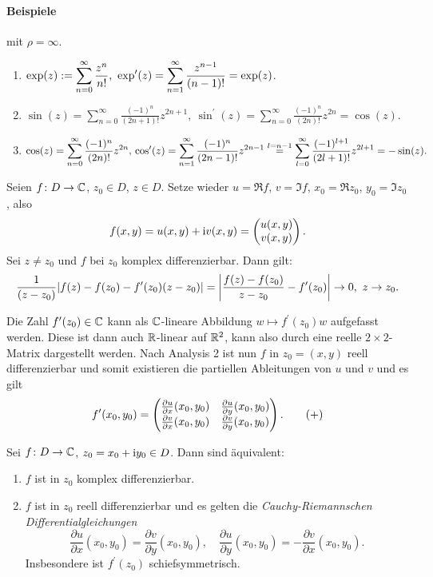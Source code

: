 \documentclass[a4paper,twoside,DIV15,BCOR12mm]{scrbook}
\begin{document}
\paragraph{Beispiele} mit $\rho = \infty$.\begin{enumerate}
\item $\displaystyle \exp(z) := \sum_{n=0}^\infty \frac{z^n}{n!},\ \exp^\prime(z) = \sum_{n=1}^\infty \frac{z^{n-1}}{(n-1)!} = \exp(z)$.
\item $\displaystyle \sin(z) = \sum_{n=0}^\infty \frac{(-1)^n}{(2n+1)!}z^{2n+1},\ \sin^\prime(z) = \sum_{n=0}^\infty \frac{(-1)^n}{(2n)!}z^{2n} = \cos(z).$
\item $\displaystyle \cos(z) = \sum_{n=0}^\infty \frac{(-1)^n}{(2n)!}z^{2n},\newline \cos^\prime(z) = \sum_{n=1}^\infty \frac{(-1)^n}{(2n-1)!}z^{2n-1} \stackrel{l=n-1}{=} \sum_{l=0}^\infty \frac{(-1)^{l+1}}{(2l+1)!}z^{2l+1} = -\sin(z).$
\end{enumerate}


\noindent Seien $f\colon D\rightarrow\mathbb{C}$, $z_0\in D$, $z\in D$. Setze wieder $u = \Re f$, $v = \Im f$, $x_0 = \Re z_0$, $y_0 = \Im z_0$, also
\[f(x,y) = u(x,y) + \mathrm{i} v(x,y) = \left(\!\!\!\begin{array}{c}u(x,y)\\v(x,y)\end{array}\!\!\!\right).\]
Sei $z\neq z_0$ und $f$ bei $z_0$ komplex differenzierbar. Dann gilt:
\[\frac{1}{(z-z_0)}|f(z)-f(z_0)-f^\prime(z_0)(z-z_0)| = \left\lvert\frac{f(z)-f(z_0)}{z-z_0} - f^\prime(z_0)\right\lvert \rightarrow 0,\ z\rightarrow z_0.\]

Die Zahl $f^\prime(z_0)\in\mathbb{C}$ kann als $\mathbb{C}$-lineare Abbildung $w\mapsto f^\prime(z_0)w$ aufgefasst werden. Diese ist dann auch $\mathbb{R}$-linear auf $\mathbb{R}^2$, kann also durch eine reelle $2\times 2$-Matrix dargestellt werden. Nach Analysis 2 ist nun $f$ in $z_0 = (x,y)$ reell differenzierbar und somit existieren die partiellen Ableitungen von $u$ und $v$ und es gilt
\[\label{1.3+}f^\prime(x_0,y_0) = \left(\!\!\!\begin{array}{c c}\frac{\partial u}{\partial x} (x_0,y_0) & \frac{\partial u}{\partial y} (x_0,y_0)\\
\frac{\partial v}{\partial x} (x_0,y_0) & \frac{\partial v}{\partial y} (x_0,y_0)\end{array}\!\!\!\right).\tag{+}\]

\begin{satz} \label{satz1.4}
  Sei $f\colon D\rightarrow\mathbb{C}$, $z_0 = x_0 + \mathrm{i} y_0\in D$. Dann sind äquivalent:
\begin{enumerate}
\item $f$ ist in $z_0$ komplex differenzierbar.
\item $f$ ist in $z_0$ reell differenzierbar und es gelten die \emph{Cauchy-Riemannschen Differentialgleichungen}
\begin{equation} \label{CR}
\frac{\partial u}{\partial x} (x_0,y_0) = \frac{\partial v}{\partial y} (x_0,y_0),\quad \frac{\partial u}{\partial y} (x_0,y_0) =
-\frac{\partial v}{\partial x} (x_0,y_0). \tag{CR}
\end{equation}
Insbesondere ist $f^\prime(z_0)$ schiefsymmetrisch.
\end{enumerate}
\end{satz}
\end{document}

